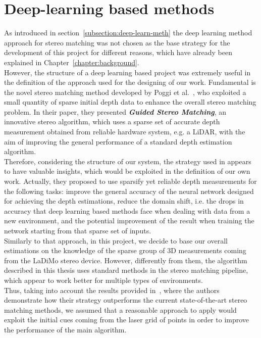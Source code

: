 \section{Deep-learning based methods}
\label{section:deep-learning-method}

As introduced in section~\ref{subsection:deep-learn-meth} the deep learning method approach for stereo matching was not chosen as the base strategy for the development of this project for different reasons, which have already been explained in Chapter~\ref{chapter:background}.\\
However, the structure of a deep learning based project was extremely useful in the definition of the approach used for the designing of our work.
Fundamental is the novel stereo matching method developed by Poggi et al.~\cite{Poggi2019}, who exploited a small quantity of sparse initial depth data to enhance the overall stereo matching problem.
In their paper, they presented \textbf{\textit{Guided Stereo Matching}}, an innovative stereo algorithm, which uses a sparse set of accurate depth measurement obtained from reliable hardware system, e.g. a LiDAR, with the aim of improving the general performance of a standard depth estimation algorithm.\\
Therefore, considering the structure of our system, the strategy used in \cite{Poggi2019} appears to have valuable insights, which would be exploited in the definition of our own work.
Actually, they proposed to use sparsify yet reliable depth measurements for the following tasks: improve the general accuracy of the neural network designed for achieving the depth estimations, reduce the domain shift, i.e. the drops in accuracy that deep learning based methods face when dealing with data from a new environment, and the potential improvement of the result when training the network starting from that sparse set of inputs.\\
Similarly to that approach, in this project, we decide to base our overall estimations on the knowledge of the sparse group of 3D measurements coming from the LaDiMo stereo device.
However, differently from them, the algorithm described in this thesis uses standard methods in the stereo matching pipeline, which appear to work better for multiple types of environments. \\
Thus, taking into account the results provided in~\cite{Poggi2019}, where the authors demonstrate how their strategy outperforms the current state-of-the-art stereo matching methods, we assumed that a reasonable approach to apply would exploit the initial cues coming from the laser grid of points in order to improve the performance of the main algorithm. 
